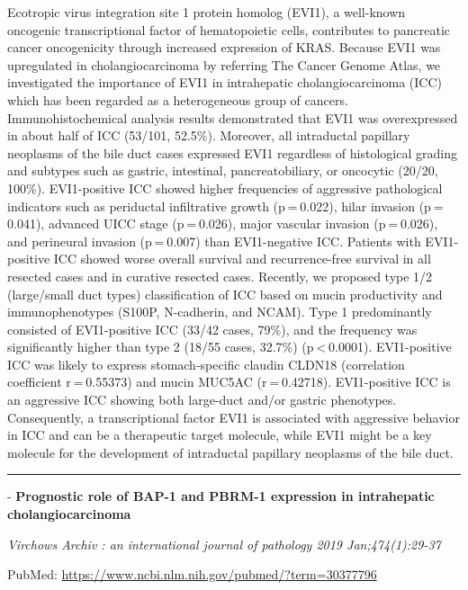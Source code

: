\documentclass[]{article}
\begin{document}
Ecotropic virus integration site 1 protein homolog (EVI1), a well-known
oncogenic transcriptional factor of hematopoietic cells, contributes to
pancreatic cancer oncogenicity through increased expression of KRAS.
Because EVI1 was upregulated in cholangiocarcinoma by referring The
Cancer Genome Atlas, we investigated the importance of EVI1 in
intrahepatic cholangiocarcinoma (ICC) which has been regarded as a
heterogeneous group of cancers. Immunohistochemical analysis results
demonstrated that EVI1 was overexpressed in about half of ICC (53/101,
52.5\%). Moreover, all intraductal papillary neoplasms of the bile duct
cases expressed EVI1 regardless of histological grading and subtypes
such as gastric, intestinal, pancreatobiliary, or oncocytic (20/20,
100\%). EVI1-positive ICC showed higher frequencies of aggressive
pathological indicators such as periductal infiltrative growth
(p = 0.022), hilar invasion (p = 0.041), advanced UICC stage
(p = 0.026), major vascular invasion (p = 0.026), and perineural
invasion (p = 0.007) than EVI1-negative ICC. Patients with EVI1-positive
ICC showed worse overall survival and recurrence-free survival in all
resected cases and in curative resected cases. Recently, we proposed
type 1/2 (large/small duct types) classification of ICC based on mucin
productivity and immunophenotypes (S100P, N-cadherin, and NCAM). Type 1
predominantly consisted of EVI1-positive ICC (33/42 cases, 79\%), and
the frequency was significantly higher than type 2 (18/55 cases, 32.7\%)
(p \textless{} 0.0001). EVI1-positive ICC was likely to express
stomach-specific claudin CLDN18 (correlation coefficient r = 0.55373)
and mucin MUC5AC (r = 0.42718). EVI1-positive ICC is an aggressive ICC
showing both large-duct and/or gastric phenotypes. Consequently, a
transcriptional factor EVI1 is associated with aggressive behavior in
ICC and can be a therapeutic target molecule, while EVI1 might be a key
molecule for the development of intraductal papillary neoplasms of the
bile duct.

{}

{}

\begin{center}\rule{0.5\linewidth}{\linethickness}\end{center}

 - \textbf{Prognostic role of BAP-1 and PBRM-1 expression in
intrahepatic cholangiocarcinoma}

\emph{Virchows Archiv : an international journal of pathology 2019
Jan;474(1):29-37}

PubMed: \url{https://www.ncbi.nlm.nih.gov/pubmed/?term=30377796}
\end{document}

